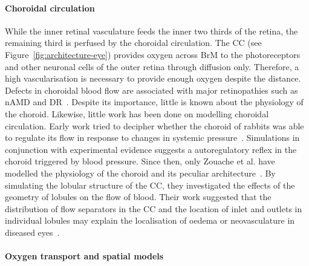 \documentclass{article}
\begin{document}
\paragraph*{Choroidal circulation}

While the inner retinal vasculature feeds the inner two thirds of the retina, the remaining third is perfused by the choroidal circulation.
The CC (see Figure~\ref{fig:architecture-eye}) provides oxygen across BrM to the photoreceptors and other neuronal cells of the outer retina through diffusion only.
Therefore, a high vascularisation is necessary to provide enough oxygen despite the distance.
Defects in choroidal blood flow are associated with major retinopathies such as nAMD and DR~\cite{Pemp_2008}.
Despite its importance, little is known about the physiology of the choroid.
Likewise, little work has been done on modelling choroidal circulation.
Early work tried to decipher whether the choroid of rabbits was able to regulate its flow in response to changes in systemic pressure~\cite{Kiel_1992}.
Simulations in conjunction with experimental evidence suggests a autoregulatory reflex in the choroid triggered by blood pressure.
Since then, only Zouache et al. have modelled the physiology of the choroid and its peculiar architecture~\cite{Zouache_2015,Zouache_2016}.
By simulating the lobular structure of the CC, they investigated the effects of the geometry of lobules on the flow of blood.
Their work suggested that the distribution of flow separators in the CC and the location of inlet and outlets in individual lobules may explain the localisation of oedema or neovasculature in diseased eyes~\cite{Zouache_2015}.

\paragraph*{Oxygen transport and spatial models}
\end{document}
